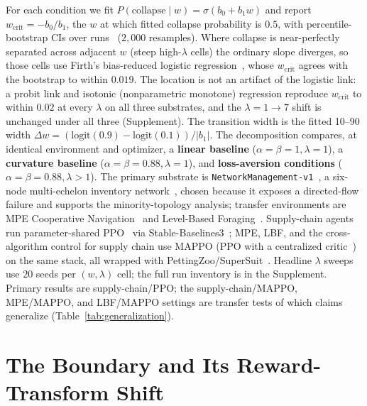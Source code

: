 \documentclass[letterpaper]{article} %
\theoremstyle{plain}
\newcommand{\wcrit}{w_{\mathrm{crit}}}
\begin{document}
For each condition we fit $P(\mathrm{collapse}\mid w)=\sigma(b_0+b_1 w)$ and report
$\wcrit=-b_0/b_1$, the $w$ at which fitted collapse probability is $0.5$, with percentile-bootstrap
CIs over runs~\citep{efron1993bootstrap} ($2{,}000$ resamples). Where collapse is near-perfectly
separated across adjacent $w$ (steep high-$\lambda$ cells) the ordinary slope diverges, so those cells
use Firth's bias-reduced logistic regression~\citep{firth1993}, whose $\wcrit$ agrees with the
bootstrap to within $0.019$. The location is not an artifact of the logistic link: a probit link and
isotonic (nonparametric monotone) regression reproduce $\wcrit$ to within $0.02$ at every $\lambda$ on
all three substrates, and the $\lambda{=}1{\to}7$ shift is unchanged under all three (Supplement). The
transition width is the fitted 10--90 width $\Delta w=(\mathrm{logit}(0.9)-\mathrm{logit}(0.1))/|b_1|$.
The decomposition compares, at identical environment and optimizer, a \textbf{linear baseline}
($\alpha{=}\beta{=}1,\lambda{=}1$), a \textbf{curvature baseline} ($\alpha{=}\beta{=}0.88,\lambda{=}1$),
and \textbf{loss-aversion conditions} ($\alpha{=}\beta{=}0.88,\lambda>1$). The primary substrate is
\texttt{NetworkManagement-v1}~\citep{hubbs2020orgym}, a six-node multi-echelon inventory
network~\citep{oroojlooyjadid2022,gijsbrechts2022,marlim2023}, chosen because it exposes a
directed-flow failure and supports the minority-topology analysis; transfer environments are MPE
Cooperative Navigation~\citep{lowe2017multi} and Level-Based Foraging~\citep{christianos2020shared}.
Supply-chain agents run parameter-shared PPO~\citep{schulman2017ppo} via
Stable-Baselines3~\citep{raffin2021sb3}; MPE, LBF, and the cross-algorithm control for supply chain use MAPPO (PPO with
a centralized critic~\citep{yu2022surprising}) on the same stack, all wrapped with
PettingZoo/SuperSuit~\citep{terry2021pettingzoo,terry2020supersuit}. Headline $\lambda$ sweeps use
$20$ seeds per $(w,\lambda)$ cell; the full run inventory is in the Supplement. Primary results are
supply-chain/PPO; the supply-chain/MAPPO, MPE/MAPPO, and LBF/MAPPO settings are transfer tests of
which claims generalize (Table~\ref{tab:generalization}).

\section{The Boundary and Its Reward-Transform Shift}
\label{sec:results}
\end{document}
